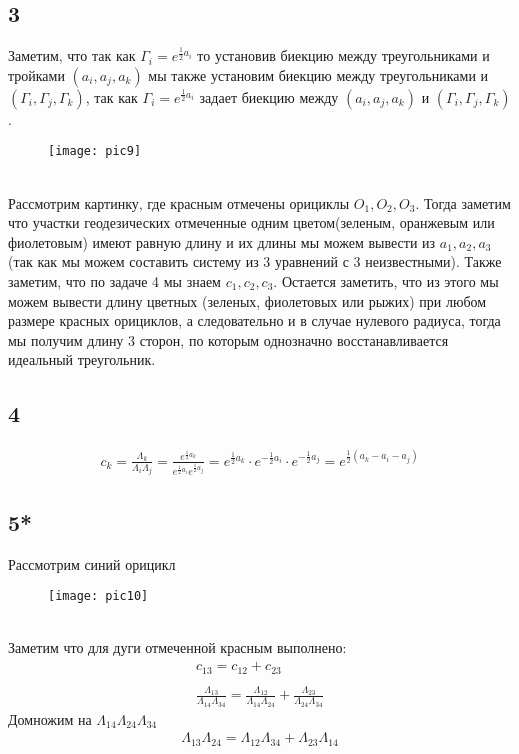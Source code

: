		\subsection*{3}
		\noindent
		Заметим, что так как $\Gamma_i = e^{\frac{1}{2}a_i}$ то установив биекцию между треугольниками и тройками $(a_i,a_j,a_k)$ мы также установим биекцию между треугольниками и $(\Gamma_i, \Gamma_j,\Gamma_k)$, так как $\Gamma_i = e^{\frac{1}{2}a_i}$ задает биекцию между $(a_i,a_j,a_k)$ и $(\Gamma_i, \Gamma_j,\Gamma_k)$.
		\begin{figure}[h!]
			\center\texttt{[image: pic9]}
		\end{figure}\\
		Рассмотрим картинку, где красным отмечены орициклы $O_1, O_2, O_3$. Тогда заметим что участки геодезических отмеченные одним цветом(зеленым, оранжевым или фиолетовым) имеют равную длину и их длины мы можем вывести из $a_1, a_2, a_3$ (так как мы можем составить систему из 3 уравнений с 3 неизвестными). Также заметим, что по задаче 4 мы знаем $c_1, c_2, c_3$. Остается заметить, что из этого мы можем вывести длину цветных (зеленых, фиолетовых или рыжих) при любом размере красных орициклов, а следовательно и в случае нулевого радиуса, тогда мы получим длину 3 сторон, по которым однозначно восстанавливается идеальный треугольник.\\
		
		\subsection*{4}
		\begin{gather*}
			c_k = \frac{\Lambda_k}{\Lambda_i \Lambda_j} = \frac{e^{\frac{1}{2}a_{k}}}{e^{\frac{1}{2}a_{i}} e^{\frac{1}{2}a_{j}}} = e^{\frac{1}{2}a_{k}} \cdot e^{-\frac{1}{2}a_{i}} \cdot e^{-\frac{1}{2}a_{j}} = e^{\frac{1}{2}(a_{k} - a_{i} - a_{j})}
		\end{gather*}
		
		\subsection*{5*}
		\noindent
		Рассмотрим синий орицикл
		\begin{figure}[h]
			\center\texttt{[image: pic10]}
		\end{figure}\\
		Заметим что для дуги отмеченной красным выполнено:
		\begin{gather*}
			c_{13} = c_{12} + c_{23}\\
			\\
			\frac{\Lambda_{13}}{\Lambda_{14}\Lambda_{34}} = \frac{\Lambda_{12}}{\Lambda_{14}\Lambda_{24}} + \frac{\Lambda_{23}}{\Lambda_{24}\Lambda_{34}}
		\end{gather*}
		Домножим на $\Lambda_{14}\Lambda_{24}\Lambda_{34}$
		\begin{gather*}
			\Lambda_{13}\Lambda_{24} = \Lambda_{12}\Lambda_{34} + \Lambda_{23}\Lambda_{14}
		\end{gather*}
		
		\begin{comment}
		\subsection*{6*}
		\noindent
		Заметим что для всех треугольников данной фигуры должно быть выполнено неравенство треугольника 
		\begin{gather*}
		\end{gather*}
		\end{comment}